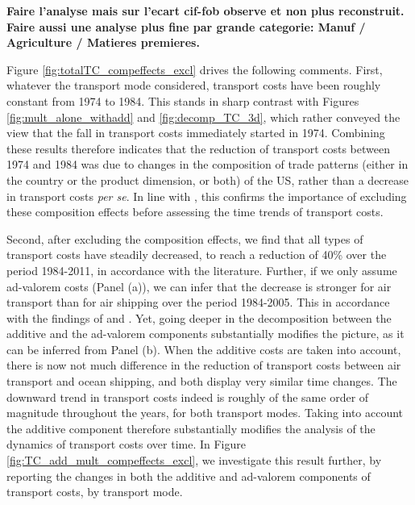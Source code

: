 \documentclass[a4paper,11pt]{article}
\begin{document}
\textbf{Faire l'analyse mais sur l'ecart cif-fob observe et non plus reconstruit. Faire aussi une analyse plus fine par grande categorie: Manuf / Agriculture / Matieres premieres.}


Figure \ref{fig:totalTC_compeffects_excl} drives the following comments. First, whatever the transport mode considered, transport costs have been roughly constant from 1974 to 1984. This stands in sharp contrast with Figures \ref{fig:mult_alone_withadd} and \ref{fig:decomp_TC_3d}, which rather conveyed the view that the fall in transport costs immediately started in 1974. Combining these results therefore indicates that the reduction of transport costs between 1974 and 1984 was due to changes in the composition of trade patterns (either in the country or the product dimension, or both) of the US, rather than a decrease in transport costs \textit{per se}. In line with \citet{hummels2007}, this confirms the importance of excluding these composition effects before assessing the time trends of transport costs.

Second, after excluding the composition effects, we find that all types of transport costs have steadily decreased, to reach a reduction of 40\% over the period 1984-2011, in accordance with the literature. Further, if we only assume ad-valorem costs (Panel (a)), we can infer that the decrease is stronger for air transport than for air shipping over the period 1984-2005. This in accordance with the findings of \cite{hummels2007} and \cite{Behar_Venables}. Yet, going deeper in the decomposition between the additive and the ad-valorem components substantially modifies the picture, as it can be inferred from Panel (b). When the additive costs are taken into account, there is now not much difference in the reduction of transport costs between air transport and ocean shipping, and both display very similar time changes. The downward trend in transport costs indeed is roughly of the same order of magnitude throughout the years, for both transport modes. Taking into account the additive component therefore substantially modifies the analysis of the dynamics of transport costs over time. In Figure \ref{fig:TC_add_mult_compeffects_excl}, we investigate this result further, by reporting the changes in both the additive and ad-valorem components of transport costs, by transport mode.
\end{document}
